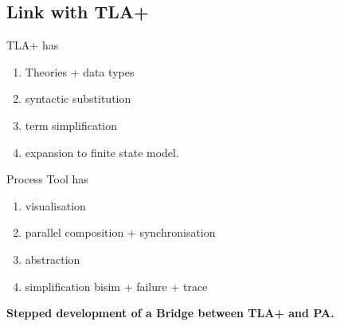 \documentclass[]{article}
\begin{document}
 \subsection{Link with TLA+}
 \noindent\begin{center}\begin{minipage}{0.45\textwidth}
 TLA+ has
  \begin{enumerate}
  \item Theories + data types
  \item syntactic substitution
  \item term simplification
  \item expansion to finite state model.
  \end{enumerate}
 \end{minipage}
 \begin{minipage}{0.5\textwidth} Process Tool has
   \begin{enumerate}
   \item visualisation
   \item parallel composition + synchronisation
   \item abstraction
   \item simplification  bisim + failure + trace

   \end{enumerate}
 \end{minipage}
 \end{center}


  {\bf Stepped development of a Bridge between TLA+ and PA.}
\end{document}
